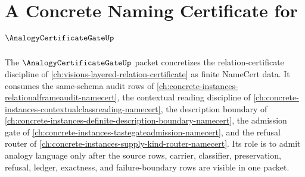 \chapter{A Concrete Naming Certificate for $\AnalogyCertificateGateUp$}
\label{ch:concrete-instances-analogycertificategate-namecert}

The $\AnalogyCertificateGateUp$ packet concretizes the relation-certificate discipline of \autoref{ch:visions-layered-relation-certificate} as finite NameCert data. It consumes the same-schema audit rows of \autoref{ch:concrete-instances-relationalframeaudit-namecert}, the contextual reading discipline of \autoref{ch:concrete-instances-contextualclassreading-namecert}, the description boundary of \autoref{ch:concrete-instances-definite-description-boundary-namecert}, the admission gate of \autoref{ch:concrete-instances-tastegateadmission-namecert}, and the refusal router of \autoref{ch:concrete-instances-supply-kind-router-namecert}. Its role is to admit analogy language only after the source rows, carrier, classifier, preservation, refusal, ledger, exactness, and failure-boundary rows are visible in one packet.

